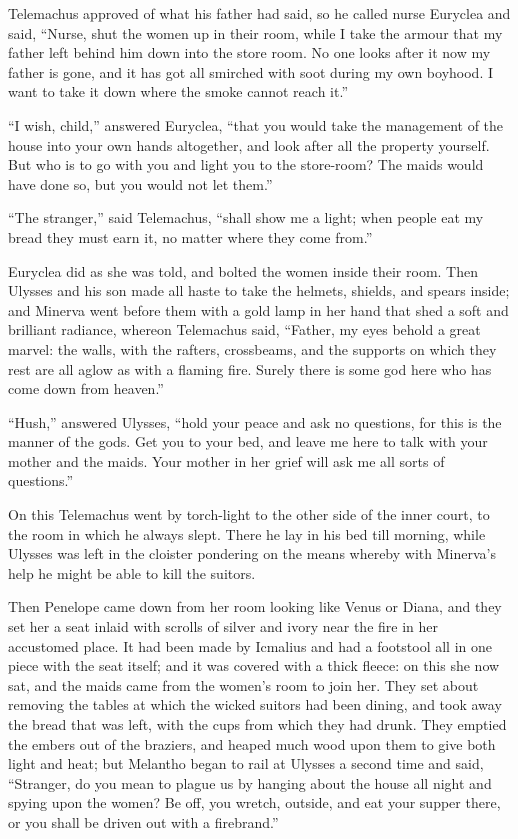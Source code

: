 Telemachus approved of what his father had said, so he called nurse Euryclea
and said, “Nurse, shut the women up in their room, while I take the armour that
my father left behind him down into the store room. No one looks after it now
my father is gone, and it has got all smirched with soot during my own boyhood.
I want to take it down where the smoke cannot reach it.”

“I wish, child,” answered Euryclea, “that you would take the management of the
house into your own hands altogether, and look after all the property yourself.
But who is to go with you and light you to the store-room? The maids would have
done so, but you would not let them.”

“The stranger,” said Telemachus, “shall show me a light; when people eat my
bread they must earn it, no matter where they come from.”

Euryclea did as she was told, and bolted the women inside their room. Then
Ulysses and his son made all haste to take the helmets, shields, and spears
inside; and Minerva went before them with a gold lamp in her hand that shed a
soft and brilliant radiance, whereon Telemachus said, “Father, my eyes behold a
great marvel: the walls, with the rafters, crossbeams, and the supports on
which they rest are all aglow as with a flaming fire. Surely there is some god
here who has come down from heaven.”

“Hush,” answered Ulysses, “hold your peace and ask no questions, for this is
the manner of the gods. Get you to your bed, and leave me here to talk with
your mother and the maids. Your mother in her grief will ask me all sorts of
questions.”

On this Telemachus went by torch-light to the other side of the inner court, to
the room in which he always slept. There he lay in his bed till morning, while
Ulysses was left in the cloister pondering on the means whereby with Minerva’s
help he might be able to kill the suitors.

Then Penelope came down from her room looking like Venus or Diana, and they set
her a seat inlaid with scrolls of silver and ivory near the fire in her
accustomed place. It had been made by Icmalius and had a footstool all in one
piece with the seat itself; and it was covered with a thick fleece: on this she
now sat, and the maids came from the women’s room to join her. They set about
removing the tables at which the wicked suitors had been dining, and took away
the bread that was left, with the cups from which they had drunk. They emptied
the embers out of the braziers, and heaped much wood upon them to give both
light and heat; but Melantho began to rail at Ulysses a second time and said,
“Stranger, do you mean to plague us by hanging about the house all night and
spying upon the women? Be off, you wretch, outside, and eat your supper there,
or you shall be driven out with a firebrand.”

